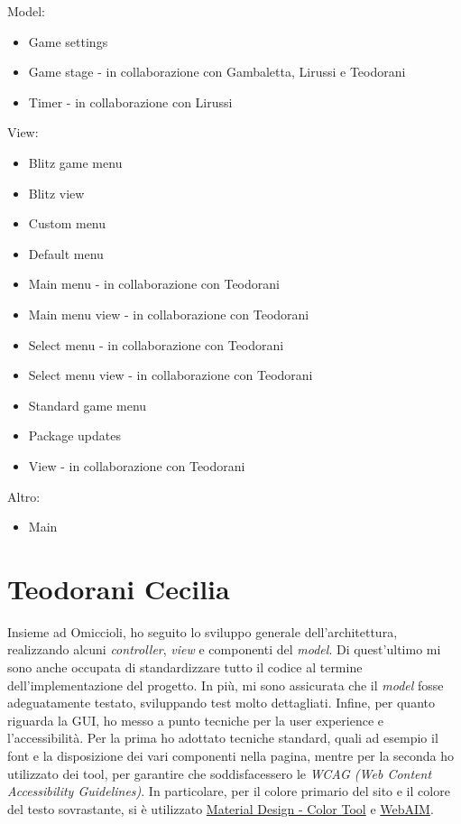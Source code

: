     Model:
    \begin{itemize}
        \item Game settings
        \item Game stage - in collaborazione con Gambaletta, Lirussi e Teodorani
        \item Timer - in collaborazione con Lirussi
    \end{itemize}
    View:
    \begin{itemize}
        \item Blitz game menu
        \item Blitz view
        \item Custom menu
        \item Default menu
        \item Main menu - in collaborazione con Teodorani
        \item Main menu view - in collaborazione con Teodorani
        \item Select menu - in collaborazione con Teodorani
        \item Select menu view - in collaborazione con Teodorani
        \item Standard game menu
        \item Package updates
        \item View - in collaborazione con Teodorani
    \end{itemize}
    Altro:
    \begin{itemize}
        \item Main
    \end{itemize}
    
\section{Teodorani Cecilia}
    Insieme ad Omiccioli, ho seguito lo sviluppo generale dell'architettura, realizzando alcuni \textit{controller}, \textit{view} e componenti del \textit{model}. Di quest'ultimo mi sono anche occupata di standardizzare tutto il codice al termine dell'implementazione del progetto. In più, mi sono assicurata che il \textit{model} fosse adeguatamente testato, sviluppando test molto dettagliati. Infine, per quanto riguarda la GUI, ho messo a punto tecniche per la user experience e l'accessibilità. Per la prima ho adottato tecniche standard, quali ad esempio il font e la disposizione dei vari componenti nella pagina, mentre per la seconda ho utilizzato dei tool, per garantire che soddisfacessero le \textit{WCAG (Web Content Accessibility Guidelines)}. In particolare, per il colore primario del sito e il colore del testo sovrastante, si è utilizzato \href{https://m2.material.io/resources/color/#!/?view.left=1&view.right=1&primary.color=8a171a&secondary.color=DEDEDE}{Material Design - Color Tool} e \href{https://webaim.org/resources/contrastchecker/?fcolor=DEDEDE&bcolor=8A171A}{WebAIM}.
    
